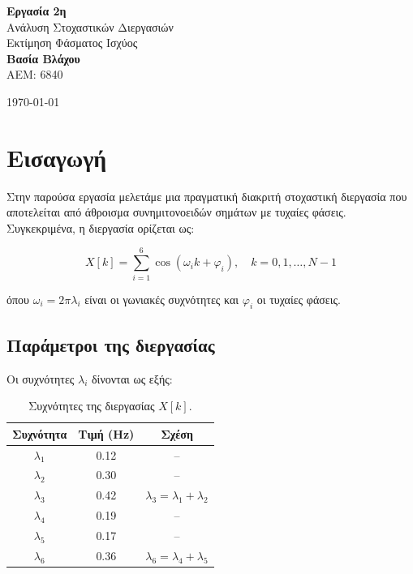 \documentclass[a4paper,12pt]{article}
\begin{document}
\begin{titlepage}
    \centering
    \vspace*{2cm}

    {\LARGE \textbf{Εργασία 2η}}\\[0.5cm]
    {\Large Ανάλυση Στοχαστικών Διεργασιών}\\[0.3cm]
    {\Large Εκτίμηση Φάσματος Ισχύος}\\[2cm]

    {\large
    \textbf{Βασία Βλάχου}\\[0.3cm]
    ΑΕΜ: 6840\\[2cm]
    }

    \vfill
    {\large \today}
\end{titlepage}

\tableofcontents
\newpage

\section{Εισαγωγή}

Στην παρούσα εργασία μελετάμε μια πραγματική διακριτή στοχαστική διεργασία που αποτελείται από άθροισμα συνημιτονοειδών σημάτων με τυχαίες φάσεις. Συγκεκριμένα, η διεργασία ορίζεται ως:

\begin{equation}
    X[k] = \sum_{i=1}^{6} \cos(\omega_i k + \varphi_i), \quad k = 0, 1, \dots, N-1
    \label{eq:signal}
\end{equation}

όπου $\omega_i = 2\pi\lambda_i$ είναι οι γωνιακές συχνότητες και $\varphi_i$ οι τυχαίες φάσεις.

\subsection{Παράμετροι της διεργασίας}

Οι συχνότητες $\lambda_i$ δίνονται ως εξής:

\begin{table}[H]
    \centering
    \begin{tabular}{|c|c|c|}
        \hline
        \textbf{Συχνότητα} & \textbf{Τιμή (Hz)} & \textbf{Σχέση} \\
        \hline
        $\lambda_1$ & 0.12 & -- \\
        $\lambda_2$ & 0.30 & -- \\
        $\lambda_3$ & 0.42 & $\lambda_3 = \lambda_1 + \lambda_2$ \\
        $\lambda_4$ & 0.19 & -- \\
        $\lambda_5$ & 0.17 & -- \\
        $\lambda_6$ & 0.36 & $\lambda_6 = \lambda_4 + \lambda_5$ \\
        \hline
    \end{tabular}
    \caption{Συχνότητες της διεργασίας $X[k]$.}
    \label{tab:frequencies}
\end{table}
\end{document}
